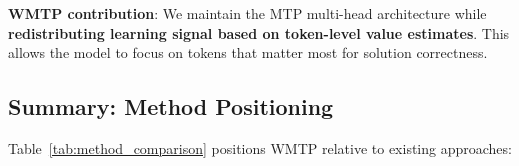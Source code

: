 \textbf{WMTP contribution}: We maintain the MTP multi-head architecture while \textbf{redistributing learning signal based on token-level value estimates}. This allows the model to focus on tokens that matter most for solution correctness.

\subsection{Summary: Method Positioning}

Table~\ref{tab:method_comparison} positions WMTP relative to existing approaches:

\begin{table}[h]
\centering
\caption{Comparison of related methods. WMTP combines weighted SFT stability with training-time-only critic usage and MTP support.}
\label{tab:method_comparison}
\end{table}
